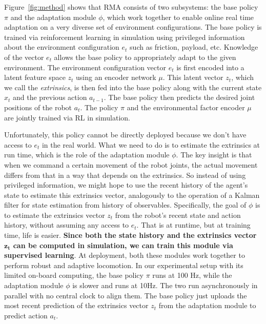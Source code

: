 \documentclass[conference]{IEEEtran}
\newcommand{\algo}{RMA}
\newcommand{\aravind}[1]{{\color{blue} {Aravind: {#1}}}}
\begin{document}
Figure~\ref{fig:method} shows that \algo{} consists of two subsystems: the base policy $\pi$ and the adaptation module $\phi$, which work together to enable online real time adaptation on a very diverse set of environment configurations. 
The base policy is trained via reinforcement learning in simulation using privileged information about the environment configuration $e_t$ such as friction, payload, etc. Knowledge of the vector $e_t$ allows the base policy to appropriately adapt to the given environment. The environment configuration vector $e_t$ is first encoded into a latent feature space $z_t$ using an encoder network $\mu$. This latent vector $z_t$, which we call the \textit{extrinsics}, is then fed into the base policy along with the current state $x_t$ and the previous action $a_{t-1}$. The base policy then predicts the desired joint positions of the robot $a_t$. The policy $\pi$ and the environmental factor encoder $\mu$ are jointly trained via RL in simulation.

Unfortunately, this policy cannot be directly deployed because we don't have access to $e_t$ in the real world. What we need to do is to estimate the extrinsics at run time, which is the role of the adaptation module $\phi$. The key insight is that when we command a certain movement of the robot joints, the actual movement differs from that in a way that depends on the extrinsics. So instead of using privileged information, we might hope to use the recent history of the agent's state to estimate this extrinsics vector, analogously to the operation of a Kalman filter for state estimation from history of observables. Specifically, the goal of $\phi$  is to estimate the extrinsics vector $z_t$ from the robot's recent state and action history, without assuming any access to $e_t$. That is at runtime, but at training time, life is easier. {\bf Since both the state history and the extrinsics vector $\mathbf{z_t}$ can be computed in simulation, we can train this module via supervised learning}. At deployment, both these modules work together to perform robust and adaptive locomotion. In our experimental setup with its limited on-board computing, the base policy $\pi$ runs at 100 Hz, while the adaptation module $\phi$ is slower and runs at 10Hz. The two run asynchronously in parallel with no central clock  to align them. The base policy just uploads the most recent prediction of the  extrinsics vector $z_t$ from the adaptation module to predict action $a_t$.
\end{document}
